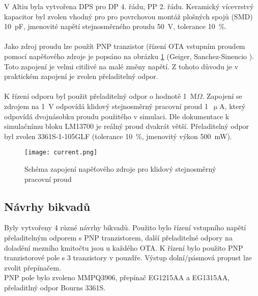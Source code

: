 \noindent V Altiu byla vytvořena DPS pro DP 4. řádu, PP 2. řádu. Keramický vícevrstvý kapacitor byl zvolen vhodný pro pro povrchovou montáž plošných spojů (SMD) 10~pF, jmenovité napětí stejnosměrného proudu 50~V, tolerance 10~\%. \\
\\
Jako zdroj proudu lze použít PNP tranzistor (řízení OTA vstupním proudem pomocí napěťového zdroje je popsáno na obrázku \ref{s:DC} (Geiger, Sanchez-Sinencio \cite{25}). Toto zapojení je velmi citilivé na malé změny napětí. Z tohoto důvodu je v praktickém zapojení je zvolen přeladitelný odpor. \\
\\
K řízení odporu byl použit přeladitelný odpor o hodnotě 1~M$\Omega$. Zapojení se zdrojem na 1~V odpovídá klidový stejnosměrný pracovní proud 1~$\upmu$A, který odpovídá dvojnásobku proudu použitého v simulaci. Dle dokumentace k simulačnímu bloku LM13700 je reálný proud dvakrát větší. Přeladitelný odpor byl zvolen 3361S-1-105GLF (tolerance 10~\%, jmenovitý výkon 500~mW). 
\begin{figure}[h]
\centering
\texttt{[image: current.png]}
\caption{Schéma zapojení napěťového zdroje pro klidový stejnosměrný pracovní proud \label{s:DC}}
\end{figure}
\subsection{Návrhy bikvadů}
\noindent Byly vytvořeny 4 různé návrhy bikvadů. Použito bylo řízení vstupního napětí přeladitelným odporem s PNP tranzistorem, další přeladitelné odpory na doladění mezního kmitočtu jsou u každého OTA. K řízení bylo použito PNP tranzistorové pole s 3 tranzistory v pouzdře. Výstup dolní/pásmová propust lze zvolit přepínačem.\\
\noindent PNP pole bylo zvoleno MMPQ3906, přepínač EG1215AA a EG1315AA, přeladitlný odpor Bourns 3361S.